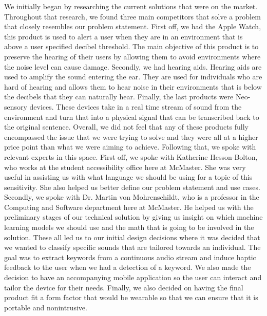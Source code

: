 \documentclass{article}
\begin{document}
We initially began by researching the current solutions that were on the market. Throughout that research, we found three main competitors that solve a problem that closely resembles our problem statement. First off, we had the Apple Watch, this product is used to alert a user when they are in an environment that is above a user specified decibel threshold. The main objective of this product is to preserve the hearing of their users by allowing them to avoid environments where the noise level can cause damage. Secondly, we had hearing aids. Hearing aids are used to amplify the sound entering the ear. They are used for individuals who are hard of hearing and allows them to hear noise in their environments that is below the decibels that they can naturally hear. Finally, the last products were Neo-sensory devices. These devices take in a real time stream of sound from the environment and turn that into a physical signal that can be transcribed back to the original sentence. Overall, we did not feel that any of these products fully encompassed the issue that we were trying to solve and they were all at a higher price point than what we were aiming to achieve.
\newline 
\newline Following that, we spoke with relevant experts in this space. First off, we spoke with Katherine Hesson-Bolton, who works at the student accessibility office here at McMaster. She was very useful in assisting us with what language we should be using for a topic of this sensitivity. She also helped us better define our problem statement and use cases. Secondly, we spoke with Dr. Martin von Mohrenschildt, who is a professor in the Computing and Software department here at McMaster. He helped us with the preliminary stages of our technical solution by giving us insight on which machine learning models we should use and the math that is going to be involved in the solution.
\newline
\newline These all led us to our initial design decisions where it was decided that we wanted to classify specific sounds that are tailored towards an individual. The goal was to extract keywords from a continuous audio stream and induce haptic feedback to the user when we had a detection of a keyword. We also made the decision to have an accompanying mobile application so the user can interact and tailor the device for their needs. Finally, we also decided on having the final product fit a form factor that would be wearable so that we can ensure that it is portable and nonintrusive.
\end{document}
